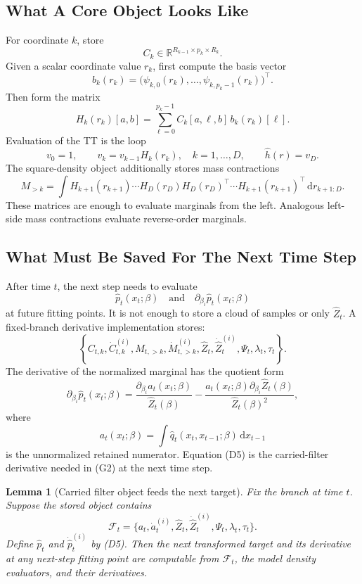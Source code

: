 \documentclass[11pt]{article}
\newtheorem{lemma}{Lemma}
\newcommand{\R}{\mathbb R}
\newcommand{\dd}{\,\mathrm d}
\begin{document}
\subsection{What A Core Object Looks Like}

For coordinate \(k\), store
\[
    C_k\in\R^{R_{k-1}\times p_k\times R_k}.
\]
Given a scalar coordinate value \(r_k\), first compute the basis vector
\[
    b_k(r_k)=
    \bigl(\psi_{k,0}(r_k),\ldots,\psi_{k,p_k-1}(r_k)\bigr)^\top.
\]
Then form the matrix
\[
    H_k(r_k)[a,b]
    =
    \sum_{\ell=0}^{p_k-1}C_k[a,\ell,b]\,b_k(r_k)[\ell].
    \tag{D1}
\]
Evaluation of the TT is the loop
\[
    v_0=1,\qquad
    v_k=v_{k-1}H_k(r_k),\quad k=1,\ldots,D,
    \qquad
    \widehat h(r)=v_D.
    \tag{D2}
\]
The square-density object additionally stores mass contractions
\[
    M_{>k}
    =
    \int H_{k+1}(r_{k+1})\cdots H_D(r_D)
    H_D(r_D)^\top\cdots H_{k+1}(r_{k+1})^\top
    \dd r_{k+1:D}.
    \tag{D3}
\]
These matrices are enough to evaluate marginals from the left.  Analogous
left-side mass contractions evaluate reverse-order marginals.

\subsection{What Must Be Saved For The Next Time Step}

After time \(t\), the next step needs to evaluate
\[
    \widehat p_t(x_t;\beta)
    \quad\text{and}\quad
    \partial_{\beta_i}\widehat p_t(x_t;\beta)
\]
at future fitting points.  It is not enough to store a cloud of samples or only
\(\widehat Z_t\).  A fixed-branch derivative implementation stores:
\[
    \left\{
    C_{t,k},\dot C_{t,k}^{(i)},M_{t,>k},\dot M_{t,>k}^{(i)},
    \widehat Z_t,\dot{\widehat Z}_t^{(i)},
    \Psi_t,\lambda_t,\tau_t
    \right\}.
    \tag{D4}
\]
The derivative of the normalized marginal has the quotient form
\[
    \partial_{\beta_i}\widehat p_t(x_t;\beta)
    =
    \frac{\partial_{\beta_i}a_t(x_t;\beta)}{\widehat Z_t(\beta)}
    -
    \frac{a_t(x_t;\beta)\partial_{\beta_i}\widehat Z_t(\beta)}
    {\widehat Z_t(\beta)^2},
    \tag{D5}
\]
where
\[
    a_t(x_t;\beta)
    =
    \int \widehat q_t(x_t,x_{t-1};\beta)\dd x_{t-1}
    \tag{D6}
\]
is the unnormalized retained numerator.  Equation (D5) is the carried-filter
derivative needed in (G2) at the next time step.

\begin{lemma}[Carried filter object feeds the next target]
Fix the branch at time \(t\).  Suppose the stored object contains
\[
    \mathcal F_t
    =
    \{a_t,\dot a_t^{(i)},\widehat Z_t,\dot{\widehat Z}_t^{(i)},
      \Psi_t,\lambda_t,\tau_t\}.
\]
Define \(\widehat p_t\) and \(\dot{\widehat p}_t^{(i)}\) by (D5).  Then the
next transformed target and its derivative at any next-step fitting point are
computable from \(\mathcal F_t\), the model density evaluators, and their
derivatives.
\end{lemma}
\end{document}

